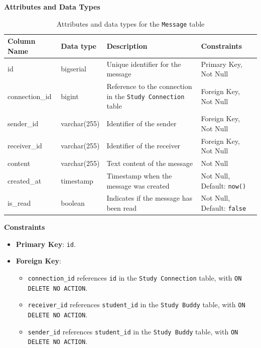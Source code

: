 \documentclass[12pt]{article}
\begin{document}
\textbf{Attributes and Data Types}
\begin{table}[H]
    \centering
    \renewcommand{\arraystretch}{1.5}
    \begin{tabular}{|l|l|p{4.5cm}|l|}
    \hline
    \rowcolor[HTML]{96FFFB} 
    \textbf{Column Name} & \textbf{Data type}        & \textbf{Description}                                   & \textbf{Constraints}             \\ \hline
    id                   & bigserial               & Unique identifier for the message                     & Primary Key, Not Null            \\ \hline
    connection\_id       & bigint                  & Reference to the connection in the \texttt{Study Connection} table & Foreign Key, Not Null           \\ \hline
    sender\_id           & varchar(255)            & Identifier of the sender                              & Foreign Key, Not Null            \\ \hline
    receiver\_id         & varchar(255)            & Identifier of the receiver                            & Foreign Key, Not Null            \\ \hline
    content              & varchar(255)            & Text content of the message                           & Not Null                         \\ \hline
    created\_at          & timestamp               & Timestamp when the message was created                & Not Null, Default: \texttt{now()} \\ \hline
    is\_read             & boolean                 & Indicates if the message has been read                & Not Null, Default: \texttt{false} \\ \hline
    \end{tabular}
    \caption{Attributes and data types for the \texttt{Message} table}
\end{table}

\noindent
\textbf{Constraints}
\begin{itemize}
    \item \textbf{Primary Key}: \texttt{id}.
    \item \textbf{Foreign Key}: 
    \begin{itemize}
        \item \texttt{connection\_id} references \texttt{id} in the \texttt{Study Connection} table, with \texttt{ON DELETE NO ACTION}.
        \item \texttt{receiver\_id} references \texttt{student\_id} in the \texttt{Study Buddy} table, with \texttt{ON DELETE NO ACTION}.
        \item \texttt{sender\_id} references \texttt{student\_id} in the \texttt{Study Buddy} table, with \texttt{ON DELETE NO ACTION}.
    \end{itemize}
\end{itemize}
\end{document}
